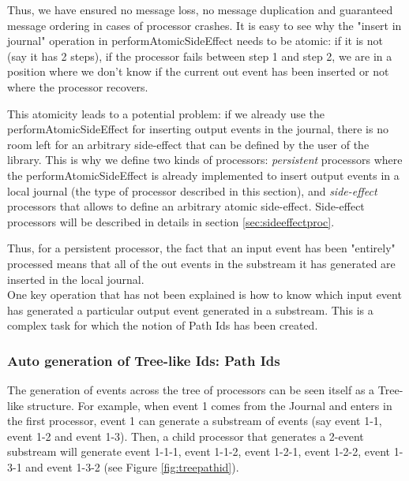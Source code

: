 Thus, we have ensured no message loss, no message duplication and guaranteed message ordering in cases of processor crashes. It is easy to see why the "insert in journal" operation in performAtomicSideEffect needs to be atomic: if it is not (say it has 2 steps), if the processor fails between step 1 and step 2, we are in a position where
we don't know if the current out event has been inserted or not where the processor recovers.

This atomicity leads to a potential problem: if we already use the performAtomicSideEffect for inserting output events in the journal, there is no room left for an arbitrary side-effect that can be defined by the user of the library. This is why we define two kinds of processors: \textit{persistent} processors where the performAtomicSideEffect is already implemented to insert output events in a local journal (the type of processor described in this section), and \textit{side-effect} processors that allows to define
an arbitrary atomic side-effect. Side-effect processors will be described in details in section \ref{sec:sideeffectproc}.

Thus, for a persistent processor, the fact that an input event has been "entirely" processed means that all of the out events in the substream it has generated are inserted in the local journal.
\\

One key operation that has not been explained is how to know which input event has generated a particular output event generated in a substream. This is a complex task for which the notion of Path Ids has been created.

\subsubsection{Auto generation of Tree-like Ids: Path Ids}

The generation of events across the tree of processors can be seen itself as a Tree-like structure. For example, when event 1 comes from the Journal and enters in the first
processor, event 1 can generate a substream of events (say event 1-1, event 1-2 and event 1-3). Then, a child processor that generates a 2-event substream
will generate event 1-1-1, event 1-1-2, event 1-2-1, event 1-2-2, event 1-3-1 and event 1-3-2 (see Figure \ref{fig:treepathid}).

